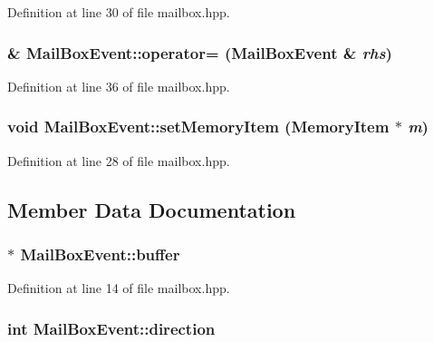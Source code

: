 Definition at line 30 of file mailbox.hpp.\hypertarget{struct_mail_box_event_a3515dd1068f31081552c20ead7fbcdb2}{
\subsubsection[{operator=}]{\& MailBoxEvent::operator= ({\bf MailBoxEvent} \& {\em rhs})}}
\label{struct_mail_box_event_a3515dd1068f31081552c20ead7fbcdb2}


Definition at line 36 of file mailbox.hpp.\hypertarget{struct_mail_box_event_abb0f7e669caa868825f47ab2798ca1ca}{
\subsubsection[{setMemoryItem}]{\setlength{\rightskip}{0pt plus 5cm}void MailBoxEvent::setMemoryItem ({\bf MemoryItem} $\ast$ {\em m})}}
\label{struct_mail_box_event_abb0f7e669caa868825f47ab2798ca1ca}


Definition at line 28 of file mailbox.hpp.

\subsection{Member Data Documentation}
\hypertarget{struct_mail_box_event_af985444da7a2549b64fe4bacc1a68ab1}{
\subsubsection[{buffer}]{$\ast$ {\bf MailBoxEvent::buffer}}}
\label{struct_mail_box_event_af985444da7a2549b64fe4bacc1a68ab1}


Definition at line 14 of file mailbox.hpp.\hypertarget{struct_mail_box_event_a751424d60431ff9008322bfe1f981008}{
\subsubsection[{direction}]{\setlength{\rightskip}{0pt plus 5cm}int {\bf MailBoxEvent::direction}}}
\label{struct_mail_box_event_a751424d60431ff9008322bfe1f981008}


